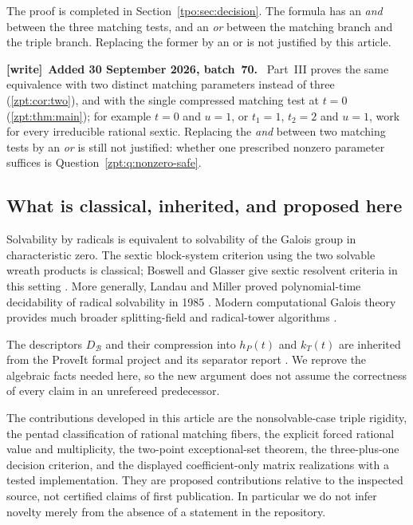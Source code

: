 \documentclass[11pt,letterpaper]{article}
\numberwithin{equation}{section}
\theoremstyle{definition}
\theoremstyle{remark}
\newenvironment{writenote}[1][]{\par\smallskip\begingroup\small
 \noindent\textbf{[write]}\if\relax\detokenize{#1}\relax\else~\textbf{#1.}\fi\ }%
 {\par\endgroup\smallskip}
\begin{document}
The proof is completed in Section~\ref{tpo:sec:decision}. The formula has an
\emph{and} between the three matching tests, and an \emph{or} between the
matching branch and the triple branch. Replacing the former by an or is not
justified by this article.

\begin{writenote}[Added 30 September 2026, batch~70]
Part~III proves the same equivalence with two distinct matching
parameters instead of three (\cref{zpt:cor:two}), and with the single
compressed matching test at $t=0$ (\cref{zpt:thm:main}); for example
$t=0$ and $u=1$, or $t_1=1$, $t_2=2$ and $u=1$, work for every irreducible
rational sextic. Replacing the \emph{and} between two matching tests by an
\emph{or} is still not justified: whether one prescribed nonzero parameter
suffices is Question~\ref{zpt:q:nonzero-safe}.
\end{writenote}

\subsection{What is classical, inherited, and proposed here}
Solvability by radicals is equivalent to solvability of the Galois group in
characteristic zero. The sextic block-system criterion using the two solvable
wreath products is classical; Boswell and Glasser give sextic resolvent
criteria in this setting \cite{boswell-glasser}. More generally, Landau and Miller
proved polynomial-time decidability of radical solvability in 1985
\cite{landau-miller}. Modern computational Galois theory provides much broader
splitting-field and radical-tower algorithms \cite{tpo:fieker}.

The descriptors $D_{\mathcal B}$ and their compression into $h_P(t)$ and
$k_T(t)$ are inherited from the ProveIt formal project and its separator report
\cite{repo-invariants,tpo:separators}. We reprove the algebraic facts needed here,
so the new argument does not assume the correctness of every claim in an
unrefereed predecessor.

The contributions developed in this article are the nonsolvable-case triple
rigidity, the pentad classification of rational matching fibers, the explicit
forced rational value and multiplicity, the two-point exceptional-set theorem,
the three-plus-one decision criterion, and the displayed coefficient-only
matrix realizations with a tested implementation. They are proposed
contributions relative to the inspected source, not certified claims of first
publication. In particular we do not infer novelty merely from the absence of
a statement in the repository.
\end{document}
